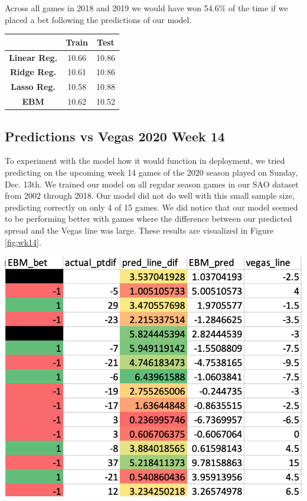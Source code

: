 \documentclass{article}
\newenvironment{Figure}
  {\par\medskip\noindent\minipage{\linewidth}}
  {\endminipage\par\medskip}
\begin{document}
\begin{multicols}{2}
Across all games in 2018 and 2019 we would have won 54.6\% of the time if we placed a bet following the predictions of our model.
\begin{center}
\begin{tabular}{ c c c }
 \toprule
  & \bf Train & \bf Test  \\
 \midrule
 \bf Linear Reg. & 10.66 & 10.86 \\ 
 \bf Ridge Reg. & 10.61 & 10.86 \\ 
 \bf Lasso Reg. & 10.58 & 10.88 \\ 
 \bf EBM & 10.62 & 10.52 \\ 
 \bottomrule
\end{tabular}
\end{center}
\subsection{Predictions vs Vegas 2020 Week 14}


To experiment with the model how it would function in deployment, we tried predicting on the upcoming week 14 games of the 2020 season played on Sunday, Dec. 13th. We trained our model on all regular season games in our SAO dataset from 2002 through 2018. Our model did not do well with this small sample size, predicting correctly on only 4 of 15 games. We did notice that our model seemed to be performing better with games where the difference between our predicted spread and the Vegas line was large. These results are visualized in Figure \ref{fig:wk14}.

\begin{Figure}
\centering  
 \includegraphics[width = \columnwidth]{figs_final/wk14_2.png}
\label{fig:wk14}
\end{Figure}


\end{multicols}
\end{document}
